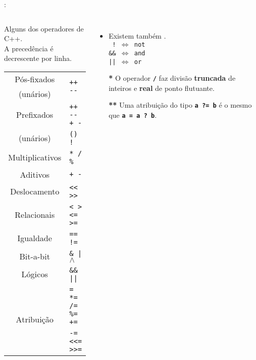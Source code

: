\begin{frame}{\insertsection: \insertsubsection}

	\begin{columns}[b]
		\begin{block}{\centering Alguns dos operadores de C++.\\{\small A precedência é decrescente por linha.}}
			\begin{tabular}{cl}
				Pós-fixados  & \multirow{2}{*}{\texttt{++ {-}{-}}}        \\
				(unários)    &                                            \\ \hline
				Prefixados   & \texttt{++ {-}{-} + -}                     \\
				(unários)    & \texttt{(\textbf{\HighlightType{tipo}}) !} \\ \hline
				Multiplicativos\HighlightSpecial{*} & \texttt{* / \%}     \\ \hline
				Aditivos     & \texttt{+ -}                               \\ \hline
				Deslocamento & \texttt{{<}{<} {>}{>}}                     \\ \hline
				Relacionais  & \texttt{< > <= >=}                         \\ \hline
				Igualdade    & \texttt{== !=}                             \\ \hline
				Bit-a-bit    & \texttt{\& | $\wedge$}                     \\ \hline
				Lógicos      & \texttt{\&\& ||}                           \\ \hline
				\multirow{2}{*}{Atribuição\HighlightSpecial{**}} & \texttt{= *= /= \%= +=} \\
										 & \texttt{-= <{<}= >{>}=}                    \\ %
			\end{tabular}
		\end{block}

		\begin{itemize}
		\item Existem também .\\
		\texttt{~!~$\Longleftrightarrow$~not}\\
		\texttt{\&\&~$\Longleftrightarrow$~and}\\
		\texttt{||~$\Longleftrightarrow$~or}\smallskip\\
		\item[\textbf{*}] O operador \textbf{\texttt{/}} faz divisão \textbf{truncada} de inteiros e \textbf{real} de ponto flutuante.
		\item[\textbf{**}] Uma atribuição do tipo \textbf{\texttt{a~?=~b}} é o mesmo que \textbf{\texttt{a~=~a~?~b}}.
		\end{itemize}
	\end{columns}

\end{frame}


